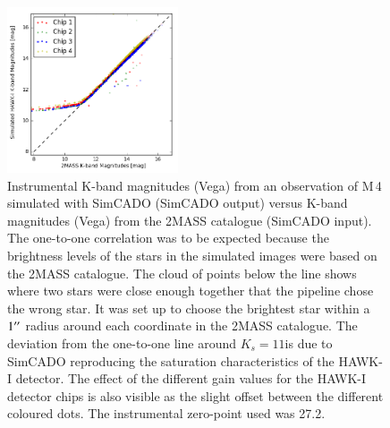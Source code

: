 \begin{figure}

    \centering
    \includegraphics[width=0.45\textwidth]{images/2MASS_vs_HAWKado_inst_mags_single}
    
    \caption{Instrumental K-band magnitudes (Vega) from an observation of M\,4 simulated with SimCADO (SimCADO output) versus K-band magnitudes (Vega) from the 2MASS catalogue (SimCADO input). The one-to-one correlation was to be expected because the brightness levels of the stars in the simulated images were based on the 2MASS catalogue. The cloud of points below the line shows where two stars were close enough together that the pipeline chose the wrong star. It was set up to choose the brightest star within a $1^{\prime\prime}$ radius around each coordinate in the 2MASS catalogue. The deviation from the one-to-one line around $K_{s}=11$\m is due to SimCADO reproducing the saturation characteristics of the HAWK-I detector. The effect of the different gain values for the HAWK-I detector chips is also visible as the slight offset between the different coloured dots. The instrumental zero-point used was 27.2\m.}
    \label{fig:2mass_hawkado_flux_comparison}

\end{figure}

